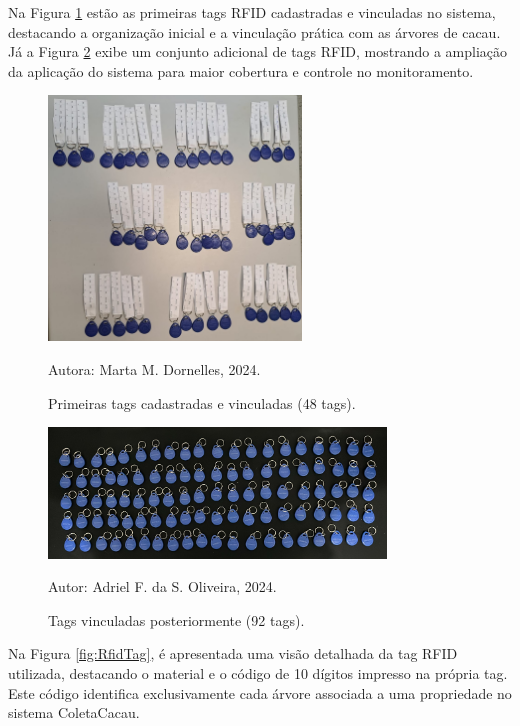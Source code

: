 Na Figura \ref{fig:RfidTags01} estão as primeiras tags RFID cadastradas e vinculadas no sistema, destacando a organização inicial e a vinculação prática com as árvores de cacau. Já a Figura \ref{fig:RfidTags02} exibe um conjunto adicional de tags RFID, mostrando a ampliação da aplicação do sistema para maior cobertura e controle no monitoramento.

\begin{figure}[H]
    \centering
    \includegraphics[width=0.6\textwidth]{images/rfid/rfid-tags-01.jpeg}
    \caption{Primeiras tags cadastradas e vinculadas (48 tags).}
    Autora: Marta M. Dornelles, 2024.
    \label{fig:RfidTags01}
\end{figure}

\begin{figure}[H]
    \centering
    \includegraphics[width=0.8\textwidth]{images/rfid/rfid-tags-02.jpeg}
    \caption{Tags vinculadas posteriormente (92 tags).}
    Autor: Adriel F. da S. Oliveira, 2024.
    \label{fig:RfidTags02}
\end{figure}

Na Figura \ref{fig:RfidTag}, é apresentada uma visão detalhada da tag RFID utilizada, destacando o material e o código de 10 dígitos impresso na própria tag. Este código identifica exclusivamente cada árvore associada a uma propriedade no sistema ColetaCacau.

